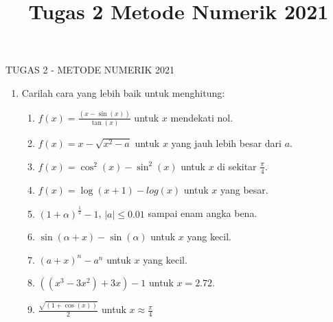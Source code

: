 \documentclass[12pt,a4paper]{report}
\title{Tugas 2 Metode Numerik 2021}
\begin{document}
	\centering TUGAS 2 - METODE NUMERIK 2021
	\begin{enumerate}
		\item Carilah cara yang lebih baik untuk menghitung:
		\begin{enumerate}
			\item $ f(x) = \frac{(x - \sin(x))}{\tan(x)}$ untuk $ x $ mendekati nol.
			\item $ f(x) = x - \sqrt{x^2 - a} $ untuk $ x $ yang jauh lebih besar dari $ a $.
			\item $ f(x) = \cos^2(x) - \sin^2(x) $ untuk $ x $ di sekitar $ \frac{\pi}{4} $.
			\item $ f(x) = \log(x+1) - log(x) $ untuk $ x $ yang besar.
			\item $ (1 + \alpha)^{\frac{1}{2}} - 1 $, $ |a| \leq 0.01 $ sampai enam angka bena.
			\item $ \sin(\alpha + x) - \sin(\alpha) $ untuk $ x $ yang kecil.
			\item $ (a + x)^n - a^n $ untuk $ x $ yang kecil.
			\item $ ((x^3-3x^2) + 3x) - 1 $ untuk $ x = 2.72 $.
			\item $ \frac{\sqrt{(1 + \cos(x))}}{2} $ untuk $ x \approx \frac{\pi}{4} $
		\end{enumerate}
	\end{enumerate}
\end{document}
